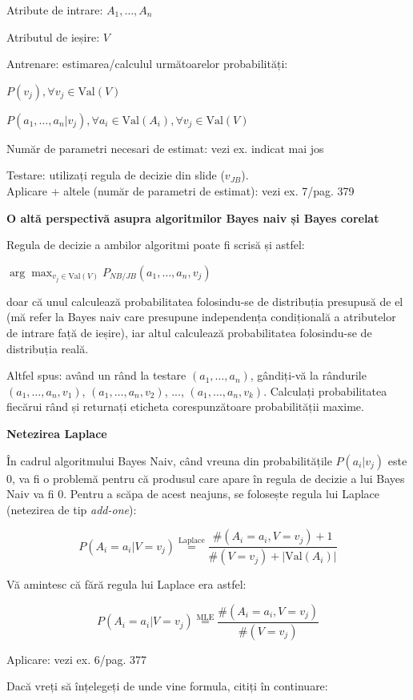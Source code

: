 \documentclass[12pt]{article}
\begin{document}
	Atribute de intrare: $A_1, \dots, A_n$
	
	Atributul de ieșire: $V$
	
	Antrenare: estimarea/calculul următoarelor probabilități:
	
	$P(v_j), \forall v_j \in \text{Val}(V)$

	$P(a_1,\dots,a_n|v_j), \forall a_i \in \text{Val}(A_i), \forall v_j \in \text{Val}(V)$

	Număr de parametri necesari de estimat: vezi ex. indicat mai jos

	Testare: utilizați regula de decizie din slide ($v_{JB}$).		
		\\
	Aplicare + altele (număr de parametri de estimat): vezi ex. 7/pag. 379	
	
	\newpage
	\textbf{{\large O altă perspectivă asupra algoritmilor Bayes naiv și Bayes corelat}}
	
	Regula de decizie a ambilor algoritmi poate fi scrisă și astfel:
	
	$\arg \max_{v_j \in \text{Val}(V)} P_{NB/JB}(a_1,\dots,a_n,v_j)$
	
	doar că unul calculează probabilitatea folosindu-se de distribuția presupusă de el (mă refer la Bayes naiv care presupune independența condițională a atributelor de intrare față de ieșire), iar altul calculează probabilitatea folosindu-se de distribuția reală.
	
	Altfel spus: având un rând la testare $(a_1,\dots,a_n)$, gândiți-vă la rândurile $(a_1,\dots,a_n,v_1)$, $(a_1,\dots,a_n,v_2)$, ..., $(a_1,\dots,a_n,v_k)$. Calculați probabilitatea fiecărui rând și returnați eticheta corespunzătoare probabilității maxime.
	
	\textbf{\large{Netezirea Laplace}}
	
	În cadrul algoritmului Bayes Naiv, când vreuna din probabilitățile $P(a_i|v_j)$ este 0, va fi o problemă pentru că produsul care apare în regula de decizie a lui Bayes Naiv va fi 0. Pentru a scăpa de acest neajuns, se folosește regula lui Laplace (netezirea de tip \textit{add-one}):
	
	$$P(A_i=a_i|V=v_j) \stackrel{\text{Laplace}}{=} \frac{\#(A_i=a_i,V=v_j) + 1}{\#(V=v_j) + |\text{Val}(A_i)|}$$
	
	Vă amintesc că fără regula lui Laplace era astfel:
	
	$$P(A_i=a_i|V=v_j) \stackrel{\text{MLE}}{=} \frac{\#(A_i=a_i,V=v_j)}{\#(V=v_j)}$$
	
	Aplicare: vezi ex. 6/pag. 377
	
	Dacă vreți să înțelegeți de unde vine formula, citiți în continuare:
	
\end{document}
